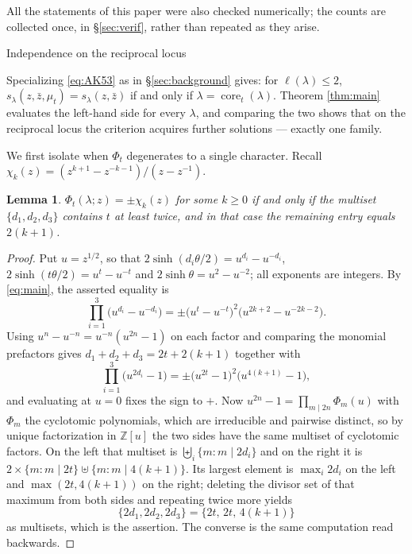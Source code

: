 \documentclass[11pt,reqno]{amsart}
\makeatletter
\renewcommand\section{\@startsection{section}{1}%
  \z@{\linespacing\@plus\linespacing}{.5\linespacing}%
  {\normalfont\large\bfseries\centering}}
\theoremstyle{plain}
\newtheorem{lemma}[theorem]{Lemma}
\theoremstyle{definition}
\newcommand{\ZZ}{\mathbb{Z}}
\newcommand{\zt}{\mu_t}
\newcommand{\core}{\operatorname{core}}
\newcommand{\zb}{\bar z}
\makeatother
\begin{document}
All the statements of this paper were also checked numerically; the counts are collected once, in
\S\ref{sec:verif}, rather than repeated as they arise.

\section{Independence on the reciprocal locus}\label{sec:independence}

Specializing \eqref{eq:AK53} as in \S\ref{sec:background} gives: for $\ell(\lambda)\le2$,
$s_\lambda(z,\zb,\zt)=s_\lambda(z,\zb)$ if and only if $\lambda=\core_t(\lambda)$. Theorem
\ref{thm:main} evaluates the left-hand side for every $\lambda$, and comparing the two shows that on
the reciprocal locus the criterion acquires further solutions --- exactly one family.

We first isolate when $\Phi_t$ degenerates to a single character. Recall
$\chi_k(z)=(z^{k+1}-z^{-k-1})/(z-z^{-1})$.

\begin{lemma}\label{lem:single}
$\Phi_t(\lambda;z)=\pm\chi_k(z)$ for some $k\ge0$ if and only if the multiset $\{d_1,d_2,d_3\}$
contains $t$ at least twice, and in that case the remaining entry equals $2(k+1)$.
\end{lemma}

\begin{proof}
Put $u=z^{1/2}$, so that $2\sinh(d_i\theta/2)=u^{d_i}-u^{-d_i}$, $2\sinh(t\theta/2)=u^{t}-u^{-t}$ and
$2\sinh\theta=u^{2}-u^{-2}$; all exponents are integers. By \eqref{eq:main}, the asserted equality is
\[
\prod_{i=1}^{3}\bigl(u^{d_i}-u^{-d_i}\bigr)
=\pm\bigl(u^{t}-u^{-t}\bigr)^{2}\bigl(u^{2k+2}-u^{-2k-2}\bigr).
\]
Using $u^{n}-u^{-n}=u^{-n}(u^{2n}-1)$ on each factor and comparing the monomial prefactors gives
$d_1+d_2+d_3=2t+2(k+1)$ together with
\[
\prod_{i=1}^{3}\bigl(u^{2d_i}-1\bigr)=\pm\bigl(u^{2t}-1\bigr)^{2}\bigl(u^{4(k+1)}-1\bigr),
\]
and evaluating at $u=0$ fixes the sign to $+$. Now $u^{2n}-1=\prod_{m\mid 2n}\Phi_m(u)$ with
$\Phi_m$ the cyclotomic polynomials, which are irreducible and pairwise distinct, so by unique
factorization in $\ZZ[u]$ the two sides have the same multiset of cyclotomic factors. On the left
that multiset is $\biguplus_i\{m:m\mid 2d_i\}$ and on the right it is
$2\times\{m:m\mid 2t\}\uplus\{m:m\mid 4(k+1)\}$. Its largest element is $\max_i 2d_i$ on the left and
$\max(2t,4(k+1))$ on the right; deleting the divisor set of that maximum from both sides and
repeating twice more yields
\[
\{2d_1,2d_2,2d_3\}=\{2t,\,2t,\,4(k+1)\}
\]
as multisets, which is the assertion. The converse is the same computation read backwards.
\end{proof}
\end{document}
